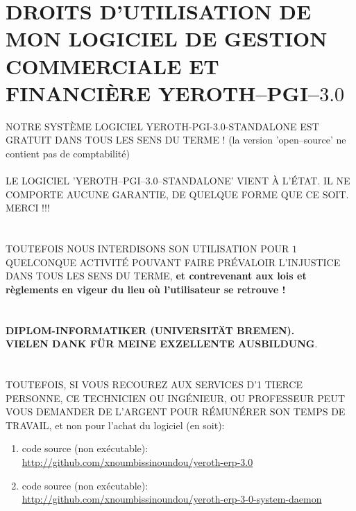 \chapter{DROITS D'UTILISATION DE MON LOGICIEL DE GESTION 
  COMMERCIALE ET FINANCI\`ERE YEROTH--PGI--$3.0$}


\textcolor{yerothColorRed}{NOTRE SYST\`EME LOGICIEL
YEROTH-PGI-3.0-STANDALONE EST GRATUIT DANS TOUS LES
SENS DU TERME ! (la version 'open--source' ne contient
pas de comptabilité)\\
\\
LE LOGICIEL 'YEROTH--PGI--3.0--STANDALONE' VIENT À
L'ÉTAT. IL NE COMPORTE AUCUNE GARANTIE, DE QUELQUE
FORME QUE CE SOIT.
\\
MERCI !!!\\
\\
\\
TOUTEFOIS NOUS INTERDISONS SON UTILISATION POUR
$1$ QUELCONQUE ACTIVIT\'E POUVANT FAIRE PR\'EVALOIR
L'INJUSTICE DANS TOUS LES SENS DU TERME, \textbf{et
contrevenant aux lois et règlements en vigeur du lieu
où l'utilisateur se retrouve !}\\
\\
\\
\textbf{DIPLOM-INFORMATIKER (UNIVERSITÄT BREMEN).\\
VIELEN DANK FÜR MEINE EXZELLENTE AUSBILDUNG}}.\\
\\
\\
TOUTEFOIS, SI VOUS RECOUREZ AUX SERVICES D'1 TIERCE
PERSONNE, CE TECHNICIEN OU ING\'ENIEUR, OU PROFESSEUR
PEUT VOUS DEMANDER DE L'ARGENT POUR R\'EMUN\'ERER SON TEMPS DE
TRAVAIL, et non pour l'achat du logiciel (en soit):

\begin{enumerate}[1.]
	\item code source (non ex\'ecutable): \\
		{\small \url{http://github.com/xnoumbissinoundou/yeroth-erp-3.0}}
		
	\item code source (non ex\'ecutable): \\
		{\small \url{http://github.com/xnoumbissinoundou/yeroth-erp-3-0-system-daemon}}
\end{enumerate}
